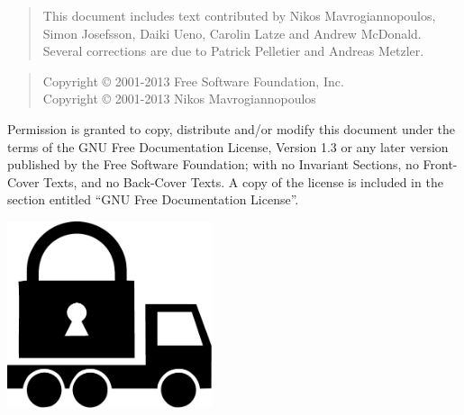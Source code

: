 \thispagestyle{empty}

\begin{quotation}
This document includes text contributed by
Nikos Mavrogiannopoulos, Simon Josefsson, Daiki Ueno, 
Carolin Latze and Andrew McDonald. Several corrections are due
to Patrick Pelletier and Andreas Metzler.
\end{quotation}



\begin{quotation}
Copyright \copyright{} 2001-2013 Free Software Foundation, Inc.\\
Copyright \copyright{} 2001-2013 Nikos Mavrogiannopoulos
\end{quotation}

\begin{flushleft}
Permission is granted to copy, distribute and/or modify this document
under the terms of the GNU Free Documentation License, Version 1.3 or
any later version published by the Free Software Foundation; with no
Invariant Sections, no Front-Cover Texts, and no Back-Cover Texts.  A
copy of the license is included in the section entitled ``GNU Free
Documentation License''.
\end{flushleft}

\newpage
\thispagestyle{empty}

\begin{center}
\includegraphics[width=6cm]{../gnutls-logo.pdf}
\end{center}

